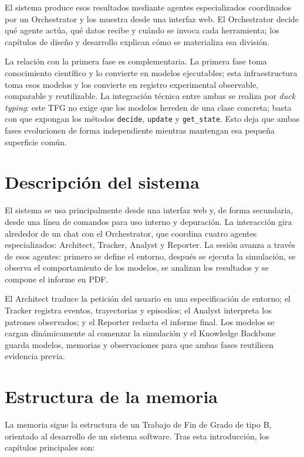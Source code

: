 El sistema produce esos resultados mediante agentes especializados coordinados
por un Orchestrator y los muestra desde una interfaz web. El Orchestrator decide
qué agente actúa, qué datos recibe y cuándo se invoca cada herramienta; los
capítulos de diseño y desarrollo explican cómo se materializa esa división.

La relación con la primera fase es complementaria. La primera fase toma
conocimiento científico y lo convierte en modelos ejecutables; esta
infraestructura toma esos modelos y los convierte en registro experimental
observable, comparable y reutilizable. La integración técnica entre ambas
se realiza por \textit{duck typing}: este TFG no exige que los
modelos hereden de una clase concreta; basta con que expongan
los métodos \texttt{decide}, \texttt{update} y \texttt{get\_state}. Esto
deja que ambas fases evolucionen de forma independiente mientras mantengan
esa pequeña superficie común.

\section{Descripción del sistema}

El sistema se usa principalmente desde una interfaz web y, de forma
secundaria, desde una línea de comandos para uso interno y depuración. La
interacción gira alrededor de un chat con el Orchestrator, que coordina
cuatro agentes especializados: Architect, Tracker, Analyst y Reporter.
La sesión avanza a través de esos agentes: primero se define el entorno,
después se ejecuta la simulación, se observa el comportamiento de los modelos,
se analizan los resultados y se compone el informe en PDF.

El Architect traduce la petición del usuario en una especificación de entorno;
el Tracker registra eventos, trayectorias y episodios; el Analyst interpreta los
patrones observados; y el Reporter redacta el informe final. Los modelos se
cargan dinámicamente al comenzar la simulación y el Knowledge Backbone guarda
modelos, memorias y observaciones para que ambas fases reutilicen evidencia
previa.



\section{Estructura de la memoria}

La memoria sigue la estructura de un Trabajo de Fin de Grado de tipo B,
orientado al desarrollo de un sistema software. Tras esta introducción, los
capítulos principales son:

